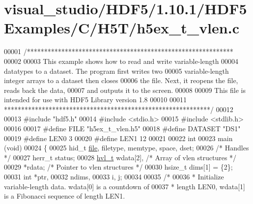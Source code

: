 \hypertarget{visual__studio_2_h_d_f5_21_810_81_2_h_d_f5_examples_2_c_2_h5_t_2h5ex__t__vlen_8c_source}{}\section{visual\+\_\+studio/\+H\+D\+F5/1.10.1/\+H\+D\+F5\+Examples/\+C/\+H5\+T/h5ex\+\_\+t\+\_\+vlen.c}
\label{visual__studio_2_h_d_f5_21_810_81_2_h_d_f5_examples_2_c_2_h5_t_2h5ex__t__vlen_8c_source}

\begin{DoxyCode}
00001 \textcolor{comment}{/************************************************************}
00002 \textcolor{comment}{}
00003 \textcolor{comment}{  This example shows how to read and write variable-length}
00004 \textcolor{comment}{  datatypes to a dataset.  The program first writes two}
00005 \textcolor{comment}{  variable-length integer arrays to a dataset then closes}
00006 \textcolor{comment}{  the file.  Next, it reopens the file, reads back the data,}
00007 \textcolor{comment}{  and outputs it to the screen.}
00008 \textcolor{comment}{}
00009 \textcolor{comment}{  This file is intended for use with HDF5 Library version 1.8}
00010 \textcolor{comment}{}
00011 \textcolor{comment}{ ************************************************************/}
00012 
00013 \textcolor{preprocessor}{#include "hdf5.h"}
00014 \textcolor{preprocessor}{#include <stdio.h>}
00015 \textcolor{preprocessor}{#include <stdlib.h>}
00016 
00017 \textcolor{preprocessor}{#define FILE            "h5ex\_t\_vlen.h5"}
00018 \textcolor{preprocessor}{#define DATASET         "DS1"}
00019 \textcolor{preprocessor}{#define LEN0            3}
00020 \textcolor{preprocessor}{#define LEN1            12}
00021 
00022 \textcolor{keywordtype}{int}
00023 main (\textcolor{keywordtype}{void})
00024 \{
00025     hid\_t       \hyperlink{structfile}{file}, filetype, memtype, space, dset;
00026                                     \textcolor{comment}{/* Handles */}
00027     herr\_t      status;
00028     \hyperlink{structhvl__t}{hvl\_t}       wdata[2],           \textcolor{comment}{/* Array of vlen structures */}
00029                 *rdata;             \textcolor{comment}{/* Pointer to vlen structures */}
00030     hsize\_t     dims[1] = \{2\};
00031     \textcolor{keywordtype}{int}         *ptr,
00032                 ndims,
00033                 i, j;
00034 
00035     \textcolor{comment}{/*}
00036 \textcolor{comment}{     * Initialize variable-length data.  wdata[0] is a countdown of}
00037 \textcolor{comment}{     * length LEN0, wdata[1] is a Fibonacci sequence of length LEN1.}

\end{DoxyCode}
